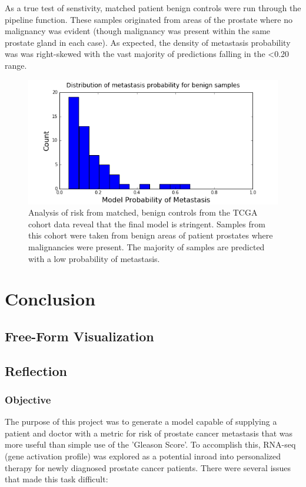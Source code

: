 \documentclass[final]{article}
\begin{document}
As a true test of senstivity, matched patient benign controls were run through the
pipeline function.  These samples originated from areas of the prostate where
no malignancy was evident (though malignancy was present within the same prostate
gland in each case).  As expected, the density of metastasis probability was was
right-skewed with the vast majority of predictions falling in the <0.20 range.

\begin{figure}
  \centering
  \includegraphics[scale = 0.5]{Sensitivity}
  \caption{\label{fig:Sensitivity} Analysis of risk from matched, benign controls from the TCGA cohort data reveal that the final model is stringent.  Samples from this cohort were taken from benign areas of patient prostates where malignancies were present.  The majority of samples are predicted with a low probability of metastasis.}
\end{figure}

\section{Conclusion}

\subsection{Free-Form Visualization}




\subsection{Reflection}

\subsubsection{Objective}

The purpose of this project was to generate a model capable of supplying a
patient and doctor with a metric for risk of prostate cancer metastasis that was
more useful than simple use of the 'Gleason Score'.  To accomplish this, RNA-seq
(gene activation profile) was explored as a potential inroad into personalized
therapy for newly diagnosed prostate cancer patients.  There were several issues
that made this task difficult:
\end{document}

